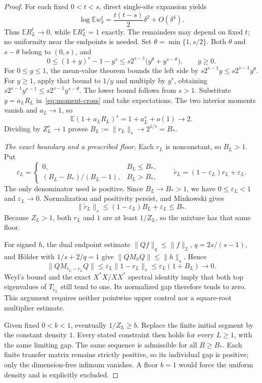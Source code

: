 \documentclass[11pt]{article}
\begin{document}
\begin{proof}
For each fixed $0<t<s$, direct single-site expansion yields
\[
 \log\mathbb Ew_\delta^t
 =\frac{t(t-s)}2\delta^2+O(\delta^4).
\]
Thus $\mathbb ER_L^t\to0$, while $\mathbb ER_L^s=1$ exactly.
The remainders may depend on fixed $t$; no uniformity near the
endpoints is needed. Set $\theta=\min\{1,s/2\}$.
Both $\theta$ and $s-\theta$ belong to $(0,s)$, and
\begin{equation}\label{eq:moment-cross}
 0\le(1+y)^s-1-y^s
 \le s2^{s-1}\bigl(y^\theta+y^{s-\theta}\bigr),\qquad y\ge0.
\end{equation}
For $0\le y\le1$, the mean-value theorem bounds the left side by
$s2^{s-1}y\le s2^{s-1}y^\theta$. For $y\ge1$, apply that
bound to $1/y$ and multiply by $y^s$, obtaining
$s2^{s-1}y^{s-1}\le s2^{s-1}y^{s-\theta}$.
The lower bound follows from $s>1$.
Substitute $y=a_LR_L$ in~\eqref{eq:moment-cross} and take expectations.
The two interior moments vanish and $a_L\to1$, so
\[
 \mathbb E(1+a_LR_L)^s=1+a_L^s+o(1)\longrightarrow2.
\]
Dividing by $Z_L^s\to1$ proves
$B_L:=\|r_L\|_s\to2^{1/s}=B_*$.

\emph{The exact boundary and a prescribed floor.}
Each $r_L$ is nonconstant, so $B_L>1$. Put
\[
 \varepsilon_L=\begin{cases}
 0,&B_L\le B_*,\\
 (B_L-B_*)/(B_L-1),&B_L>B_*,
 \end{cases}
 \qquad \widetilde r_L=(1-\varepsilon_L)r_L+\varepsilon_L.
\]
The only denominator used is positive. Since $B_L\to B_*>1$,
we have $0\le\varepsilon_L<1$ and $\varepsilon_L\to0$.
Normalization and positivity persist, and Minkowski gives
\[
 \|\widetilde r_L\|_s
 \le(1-\varepsilon_L)B_L+\varepsilon_L\le B_*.
\]
Because $Z_L>1$, both $r_L$ and $1$ are at least $1/Z_L$,
so the mixture has that same floor.

For signed $h$, the dual endpoint estimate
$\|Qf\|_q\le\|f\|_2$, $q=2s/(s-1)$, and H\"older with
$1/s+2/q=1$ give $\|QM_hQ\|\le\|h\|_s$. Hence
\[
 \|QM_{\widetilde r_L-r_L}Q\|
 \le\varepsilon_L\|1-r_L\|_s
 \le\varepsilon_L(1+B_L)\longrightarrow0.
\]
Weyl's bound and the exact $X^*X/XX^*$ spectral identity imply
that both top eigenvalues of $T_{\widetilde r_L}$ still tend to one.
Its normalized gap therefore tends to zero. This argument requires
neither pointwise upper control nor a square-root multiplier estimate.

Given fixed $0<b<1$, eventually $1/Z_L\ge b$. Replace the finite
initial segment by the constant density $1$. Every stated constraint
then holds for every $L\ge1$, with the same limiting gap. The same
sequence is admissible for all $B\ge B_*$. Each finite transfer
matrix remains strictly positive, so its individual gap is positive;
only the dimension-free infimum vanishes. A floor $b=1$ would force
the uniform density and is explicitly excluded.
\end{proof}
\end{document}
